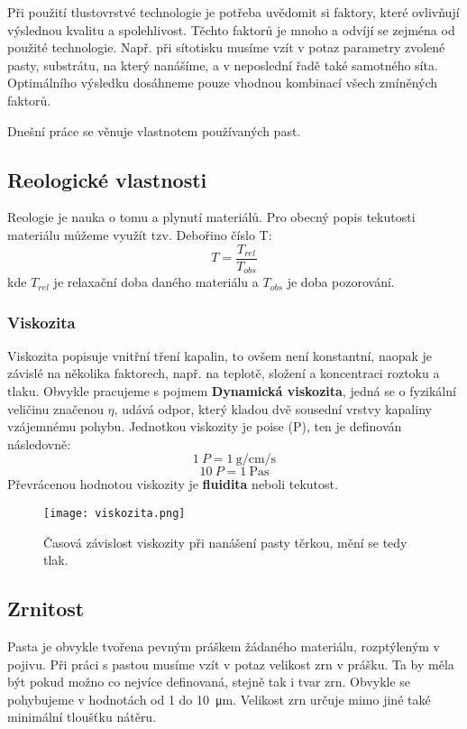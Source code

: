 Při použití tlustovrstvé technologie je potřeba uvědomit si faktory, které ovlivňují výslednou kvalitu a spolehlivost. Těchto faktorů je mnoho a odvíjí se zejména od použité technologie. 
  Např. při sítotisku musíme vzít v potaz parametry zvolené pasty, substrátu, na který nanášíme, a v neposlední řadě také samotného síta. Optimálního výsledku dosáhneme pouze vhodnou kombinací všech zmíněných faktorů. 

  Dnešní práce se věnuje vlastnotem používaných past. 
  
  \subsection{Reologické vlastnosti}
  Reologie je nauka o tomu a plynutí materiálů. Pro obecný popis tekutosti materiálu můžeme využít tzv. Debořino číslo T:
  \[
    T=  \frac{T_{rel}}{T_{obs} }
  \]
  kde \(T_{rel} \) je relaxační doba daného materiálu a \(T_{obs} \) je doba pozorování.
	
  \subsubsection{Viskozita}
    Viskozita popisuje vnitřní tření kapalin, to ovšem není konstantní, naopak je závislé na několika faktorech, např. na teplotě, složení a koncentraci roztoku a tlaku. 
    Obvykle pracujeme s pojmem \textbf{Dynamická viskozita}, jedná se o fyzikální veličinu značenou \(\eta\), udává odpor, který kladou dvě sousední vrstvy kapaliny vzájemnému pohybu. 
    Jednotkou viskozity je poise (P), ten je definován následovně:
    \[
      \qty{1}{P} = \qty{1}{\gram\per\centi\meter\per\second}
    \]
    \[  
        \qty{10}{P} = \qty{1}{\pascal\second}
    \]
    Převrácenou hodnotou viskozity je \textbf{fluidita} neboli tekutost. 

    \begin{figure}[h!]
      \centering
      \texttt{[image: viskozita.png]}
      \caption{Časová závislost viskozity při nanášení pasty těrkou, mění se tedy tlak.}
      \label{fig:viskozita-png}
    \end{figure}
    

    \subsection{Zrnitost}
      Pasta je obvykle tvořena pevným práškem žádaného materiálu, rozptýleným v pojivu. Při práci s pastou musíme vzít v potaz velikost zrn v prášku. Ta by měla být pokud možno co nejvíce definovaná, stejně tak i tvar zrn. 
      Obvykle se pohybujeme v hodnotách od 1 do \qty{10}{\micro\meter}. Velikost zrn určuje mimo jiné také minimální tloušťku nátěru. 
      
